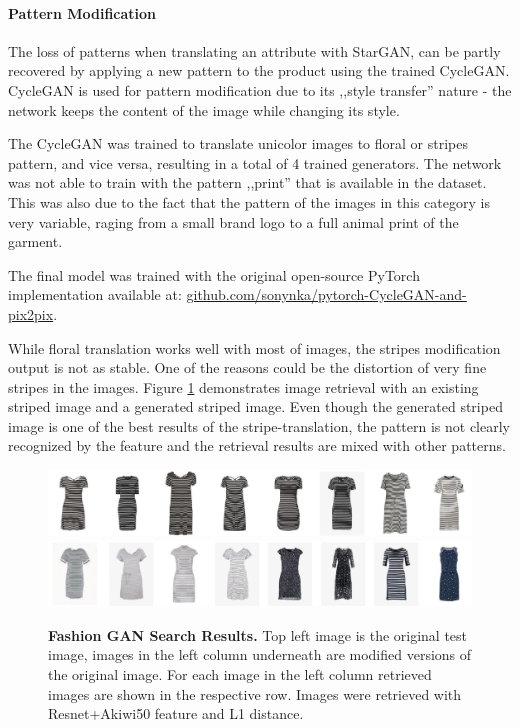 \documentclass[12pt]{report}
\begin{document}
\paragraph{Pattern Modification}
The loss of patterns when translating an attribute with StarGAN, can be partly recovered by applying a new pattern to the product using the trained CycleGAN. CycleGAN is used for pattern modification due to its ,,style transfer'' nature - the network keeps the content of the image while changing its style.

The CycleGAN was trained to translate unicolor images to floral or stripes pattern, and vice versa, resulting in a total of 4 trained generators. The network was not able to train with the pattern ,,print'' that is available in the dataset. This was also due to the fact that the pattern of the images in this category is very variable, raging from a small brand logo to a full animal print of the garment.

The final model was trained with the original open-source PyTorch implementation available at: \linebreak \hyperlink{https://github.com/sonynka/pytorch-CycleGAN-and-pix2pix}{github.com/sonynka/pytorch-CycleGAN-and-pix2pix}. 

While floral translation works well with most of images, the stripes modification output is not as stable. One of the reasons could be the distortion of very fine stripes in the images.  Figure \ref{fig:stripes_retrieval} demonstrates image retrieval with an existing striped image and a generated striped image. Even though the generated striped image is one of the best results of the stripe-translation, the pattern is not clearly recognized by the feature and the retrieval results are mixed with other patterns.

\begin{figure}[h]
\centering
{\includegraphics[width=\linewidth]{05_results/stripes_orig_results}}
{\includegraphics[width=\linewidth]{05_results/stripes_gen_results}}
\caption{\label{fig:stripes_retrieval} \textbf{Fashion GAN Search Results.} Top left image is the original test image, images in the left column underneath are modified versions of the original image. For each image in the left column retrieved images are shown in the respective row. Images were retrieved with Resnet+Akiwi50 feature and L1 distance.}
\end{figure}
\end{document}
